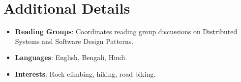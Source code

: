\documentclass[letterpaper,11pt]{article}
\newcommand{\resumeItem}[2]{
  \item\small{
    \textbf{#1}{: #2 \vspace{-2pt}}
  }
}
\newcommand{\resumeSubItem}[2]{\resumeItem{#1}{#2}\vspace{-4pt}}
\newcommand{\resumeSubHeadingListStart}{\begin{itemize}[leftmargin=*]}
\newcommand{\resumeSubHeadingListEnd}{\end{itemize}}
\begin{document}

\section{Additional Details}
  \resumeSubHeadingListStart
    \resumeSubItem{Reading Groups}
      {Coordinates reading group discussions on Distributed Systems and Software Design Patterns.}
    \resumeSubItem{Languages}
      {English, Bengali, Hindi.}
    \resumeSubItem{Interests}
      {Rock climbing, hiking, road biking.}
  \resumeSubHeadingListEnd
\end{document}
